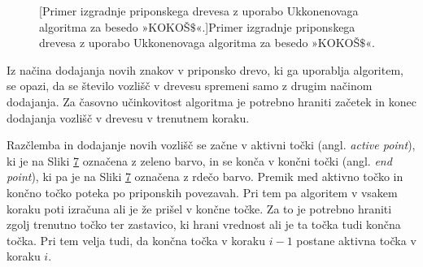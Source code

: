 \begin{figure}[htb]
\begin{subfigure}[t]{0.3\linewidth}
        
        \centering
        \label{fig:Ukkonen1}
    \end{subfigure}
    \hspace{0.5cm}
    \begin{subfigure}[t]{0.3\linewidth}
        
        \centering
        \label{fig:Ukkonen2}
    \end{subfigure}
    \hspace{0.5cm}
    \begin{subfigure}[t]{0.3\linewidth}
        
        \centering
        \label{fig:Ukkonen3}
    \end{subfigure}
    \par\bigskip 
    \begin{subfigure}[t]{0.3\linewidth}
        
        \centering
        \label{fig:Ukkonen4}
    \end{subfigure}
    \hspace{0.5cm}
    \begin{subfigure}[t]{0.3\linewidth}
        
        \centering
        \label{fig:Ukkonen5}
    \end{subfigure}
    \hspace{0.5cm}
    \begin{subfigure}[t]{0.3\textwidth}
        
        \centering
        \label{fig:Ukkonen6}
    \end{subfigure}

       [Primer izgradnje priponskega drevesa z uporabo Ukkonenovaga algoritma za besedo »KOKOŠ$\$$«.]{Primer izgradnje priponskega drevesa z uporabo Ukkonenovaga algoritma za besedo »KOKOŠ$\$$«.} 
        \label{fig:Ukkonen}
\end{figure}

Iz načina dodajanja novih znakov v priponsko drevo, ki ga uporablja algoritem, se opazi, da se število vozlišč v drevesu spremeni samo z drugim načinom dodajanja. Za časovno učinkovitost algoritma je potrebno hraniti začetek in konec dodajanja vozlišč v drevesu v trenutnem koraku.

Razčlemba in dodajanje novih vozlišč se začne v aktivni točki (angl. \textit{active point}), ki je na Sliki \ref{fig:Ukkonen} označena z zeleno barvo, in se konča v končni točki (angl. \textit{end point}), ki pa je na Sliki \ref{fig:Ukkonen} označena z rdečo barvo. Premik med aktivno točko in končno točko poteka po priponskih povezavah. Pri tem pa algoritem v vsakem koraku poti izračuna ali je že prišel v končne točke. Za to je potrebno hraniti zgolj trenutno točko ter zastavico, ki hrani vrednost ali je ta točka tudi končna točka. Pri tem velja tudi, da končna točka v koraku $i-1$ postane aktivna točka v koraku $i$. 

